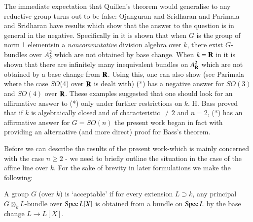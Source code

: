 The immediate expectation that Quillen's theorem would generalise to any reductive group turns out to be false: Ojanguran and Sridharan \cite{art17-key8a} and Parimala and Sridharan \cite{art17-key8b} have results which show that the answer to the question is in general in the negative. Specifically in \cite{art17-key8a} it is shown that when $G$ is the group of norm 1 elements\pageoriginale in a {\em noncommutative} division algebra over $k$, there exist $G$-bundles over $A^2_k$ which are not obtained by base change. When $k=\mathbf{R}$ in \cite{art17-key8b} it is shown that there are infinitely many inequivalent bundles on $A^2_{\mathbf{R}}$ which are not obtained by a base change from $\mathbf{R}$. Using this, one can also show (see Parimala \cite{art17-key9} where the case $SO$(4) over $\mathbf{R}$ is dealt with) (*) has a negative answer for $SO(3)$ and $SO(4)$ over $\mathbf{R}$. These examples suggested that one should look for an affirmative answer to (*) only under further restrictions on $k$. H. Bass \cite{art17-key1} proved that if $k$ is algebraically closed and of characteristic $\neq 2$ and $n =2$,  (*) has an affirmative answer for $G = SO(n)$ the present work began in fact with providing an alternative (and more direct) proof for Bass's theorem.

Before we can describe the results of the present work-which is mainly concerned with the case $n \geqslant 2 $ - we need to briefly outline the situation in the case of the affine line over $k$. For the sake of brevity in later formulations we make the following:

\begin{defi*}
A group $G$ (over $k$) is `acceptable' if for every extension $L \supset k$, any principal $G \otimes_k L$-bundle over $\operatorname{Spec} L[X]$ is obtained from a bundle on $\operatorname{Spec} L$ by the base change $L \to L[X]$.
\end{defi*}

